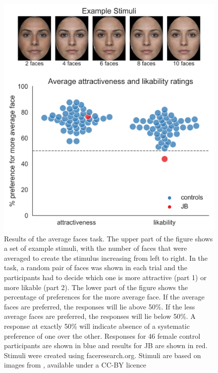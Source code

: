 \documentclass[fleqn,10pt]{SelfArx} %
\begin{document}
\begin{figure}[htbp]
	
	\renewcommand{\familydefault}{\sfdefault}\normalfont
	\centering
	\includegraphics[width=\columnwidth]{../reports/figures/attract_main_figure.png}
	\vspace*{-3mm}
 		\caption{Results of the average faces task. The upper part of the figure shows a set of example stimuli, with the number of faces that were averaged to create the stimulus increasing from left to right. In the task, a random pair of faces was shown in each trial and the participants had to decide which one is more attractive (part 1) or more likable (part 2). The lower part of the figure shows the percentage of preferences for the more average face. If the average faces are preferred, the responses will lie above 50\%. If the less average faces are preferred, the responses will lie below 50\%. A response at exactly 50\% will indicate absence of a systematic preference of one over the other. Responses for 46 female control participants are shown in blue and results for JB are shown in red. Stimuli were created using faceresearch.org. Stimuli are based on images from \citet{DeBruine2017}, available under a CC-BY licence}%
 		\label{fig:attract}
	
\end{figure}
\end{document}
